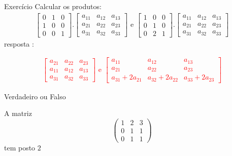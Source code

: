 \documentclass{beamer}
\begin{document}
\begin{frame}{Exercício}
 Calcular os produtos:
 \begin{gather*}
  \begin{bmatrix}
    0 & 1 & 0 \\
    1 & 0 & 0 \\
    0 & 0 & 1 
  \end{bmatrix}. \begin{bmatrix}
    a_{11} & a_{12} & a_{13} \\
    a_{21} & a_{22} & a_{23} \\
    a_{31} & a_{32} & a_{33}
  \end{bmatrix} \text{ e }\begin{bmatrix}
    1 & 0 & 0 \\
    0 & 1 & 0 \\
    0 & 2 & 1 
  \end{bmatrix}. \begin{bmatrix}
    a_{11} & a_{12} & a_{13} \\
    a_{21} & a_{22} & a_{23} \\
    a_{31} & a_{32} & a_{33}
  \end{bmatrix} 
  \end{gather*}
  resposta : \pause 

  \textcolor{red}{
    \begin{gather*}
    \begin{bmatrix}
      a_{21} & a_{22} & a_{23} \\
      a_{11} & a_{12} & a_{13} \\
      a_{31} & a_{32} & a_{33}
    \end{bmatrix} \text{ e }\begin{bmatrix}
      a_{11} & a_{12} & a_{13} \\
      a_{21} & a_{22} & a_{23} \\
      a_{31} + 2a_{21} & a_{32} +2a_{22} & a_{33} +2a_{23}
    \end{bmatrix} 
  \end{gather*}
  }
\end{frame}

\begin{frame}
  
\end{frame}


\begin{frame}{Verdadeiro ou Falso}
  \begin{block}{1}
  A matriz 
  $$ \begin{pmatrix}
    1 & 2 & 3 \\ 
    0 & 1 & 1 \\
    0 & 1 & 1
  \end{pmatrix}$$ tem posto $2$
\end{block}
\end{frame}
\end{document}
